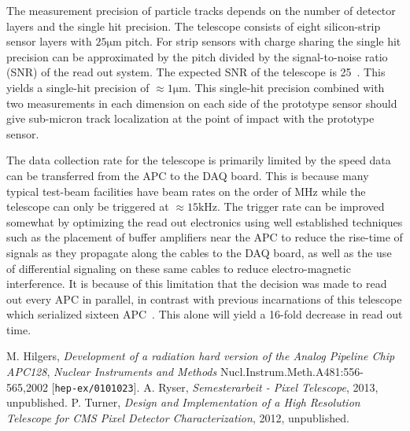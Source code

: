 \documentclass{PoS}
\newcommand{\micron}{\si{\micro\meter}}
\begin{document}
The measurement precision of particle tracks depends on the number of detector
layers and the single hit precision. The telescope consists of eight
silicon-strip sensor layers with $25\micron$ pitch. For strip sensors
with charge sharing the single hit precision can be approximated by the
pitch divided by the signal-to-noise ratio (SNR) of the read out system.
The expected SNR of the telescope is 25~\cite{Ryser2013}. This yields a single-hit precision of
$\approx1\micron$. This single-hit precision combined with two measurements in
each dimension on each side of the prototype sensor should give sub-micron
track localization at the point of impact with the prototype sensor.

The data collection rate for the telescope is primarily limited by the speed
data can be transferred from the APC to the DAQ board. This is
because many typical test-beam facilities have beam rates on the order of
\si{\mega\hertz} while the telescope can only be triggered at
$\approx15\si{\kilo\hertz}$. The trigger rate can be improved somewhat by
optimizing the read out electronics using well established techniques such as
the placement of buffer amplifiers near the APC to reduce the rise-time of
signals as they propagate along the cables to the DAQ board, as well as the use
of differential signaling on these same cables to reduce electro-magnetic
interference. It is because of this limitation that the decision was made to
read out every APC in parallel, in contrast with previous incarnations of this
telescope which serialized sixteen APC~\cite{Turner2012}. This alone will yield
a 16-fold decrease in read out time.

\begin{thebibliography}{99}
M. Hilgers,
\emph{Development of a radiation hard version of the Analog Pipeline Chip APC128},
\emph{Nuclear Instruments and Methods} Nucl.Instrum.Meth.A481:556-565,2002
[{\tt hep-ex/0101023}].
A. Ryser,
\emph{Semesterarbeit \-- Pixel Telescope},
2013, unpublished.
P. Turner,
\emph{Design and Implementation of a High Resolution Telescope for CMS Pixel Detector Characterization},
2012, unpublished.
\end{thebibliography}
\end{document}
